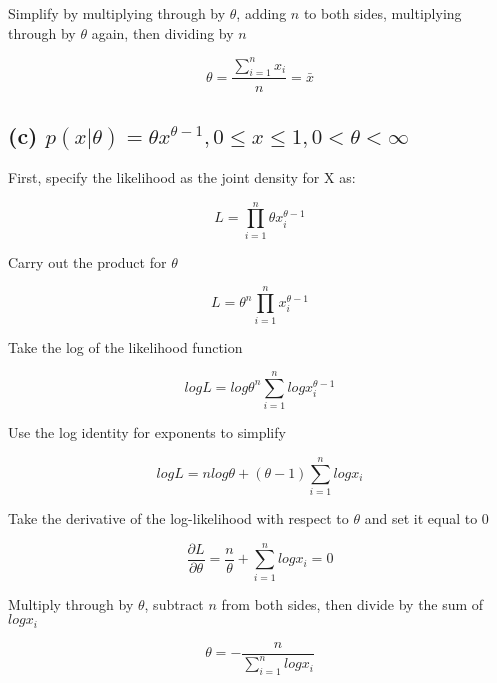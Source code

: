 \documentclass{article}
\begin{document}
\noindent Simplify by multiplying through by $\theta$, adding $n$ to both sides, multiplying through by $\theta$ again, then dividing by $n$

\begin{equation}
\theta = \frac{ \sum\limits_{i = 1}^n x_i}{n} = \bar{x}
\end{equation}


\subsection{(c) $p(x|\theta) = \theta x^{\theta - 1},  0 \leq x \leq 1, 0 < \theta < \infty$}

\noindent First, specify the likelihood as the joint density for X as:

\begin{equation}
L = \prod\limits_{i = 1}^n \theta x_i^{\theta - 1}
\end{equation}

\noindent Carry out the product for $\theta$

\begin{equation}
L = \theta^n \prod\limits_{i = 1}^n x_i^{\theta - 1}
\end{equation}

\noindent Take the log of the likelihood function

\begin{equation}
log L = log \theta^n \sum\limits_{i = 1}^n log x_i^{\theta - 1}
\end{equation}

\noindent Use the log identity for exponents to simplify

\begin{equation}
log L = n log \theta + (\theta - 1) \sum\limits_{i = 1}^n log x_i
\end{equation}

\noindent Take the derivative of the log-likelihood with respect to $\theta$ and set it equal to $0$

\begin{equation}
\frac{\partial L}{ \partial \theta } = \frac{n}{\theta} + \sum\limits_{i = 1}^n log x_i = 0
\end{equation}

\noindent Multiply through by $\theta$, subtract $n$ from both sides, then divide by the sum of $log x_i$

\begin{equation}
\theta = - \frac{n}{ \sum\limits_{i = 1}^n log x_i}
\end{equation}
\end{document}
